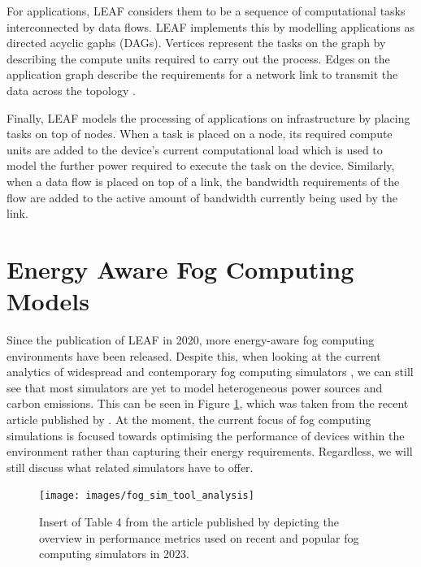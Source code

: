 \documentclass{l4proj}
\begin{document}
For applications, LEAF considers them to be a sequence of computational tasks interconnected by data flows.
LEAF implements this by modelling applications as directed acyclic gaphs (DAGs).
Vertices represent the tasks on the graph by describing the compute units required to carry out the process.
Edges on the application graph describe the requirements for a network link to transmit the data across the topology \citep{leaf2021}.

Finally, LEAF models the processing of applications on infrastructure by placing tasks on top of nodes.
When a task is placed on a node, its required compute units are added to the device's current computational load which is used to model the further power required to execute the task on the device.
Similarly, when a data flow is placed on top of a link, the bandwidth requirements of the flow are added to the active amount of bandwidth currently being used by the link.

\section{Energy Aware Fog Computing Models}\label{relWork:sec:models}

Since the publication of LEAF in 2020, more energy-aware fog computing environments have been released.
Despite this, when looking at the current analytics of widespread and contemporary fog computing simulators \citep{fogSimToolAnalysis}, we can still see that most simulators are yet to model heterogeneous power sources and carbon emissions.
This can be seen in Figure \ref{fig:fogtoolsanalysis}, which was taken from the recent article published by \cite{fogSimToolAnalysis}.
At the moment, the current focus of fog computing simulations is focused towards optimising the performance of devices within the environment rather than capturing their energy requirements.
Regardless, we will still discuss what related simulators have to offer.
\begin{figure}[h]
    \centering
    \texttt{[image: images/fog\_sim\_tool\_analysis]}
    ~
    \caption{Insert of Table 4 from the article published by \cite{fogSimToolAnalysis} depicting the overview in performance metrics used on recent and popular fog computing simulators in 2023.}
    \label{fig:fogtoolsanalysis}
\end{figure}
\end{document}
